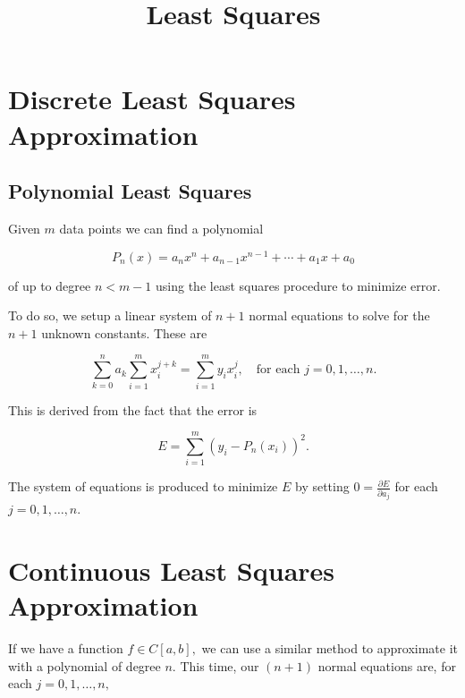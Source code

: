 \documentclass{article}
\title{Least Squares}
\begin{document}
\section{Discrete Least Squares Approximation}

\subsection{Polynomial Least Squares}

Given $m$ data points we can find a polynomial

\[ P_n(x) = a_n x^n + a_{n-1}x^{n-1} + \cdots + a_1 x + a_0 \]

of up to degree $n < m - 1$ using the least squares procedure to minimize error.

To do so, we setup a linear system of $n+1$ normal equations to solve for the $n+1$ unknown constants. These are

\[ \sum_{k=0}^n a_k \sum_{i=1}^m x_i^{j+k} = \sum_{i=1}^m y_i x_i^j, \quad \text{for each } j = 0, 1, \dots, n. \]

This is derived from the fact that the error is

\[ E = \sum_{i=1}^m (y_i - P_n(x_i))^2. \]

The system of equations is produced to minimize $E$ by setting $0 = \frac{\partial E}{\partial a_j}$  for each $j = 0, 1,\dots,n.$

\section{Continuous Least Squares Approximation}

If we have a function $f \in C[a,b],$ we can use a similar method to approximate it with a polynomial of degree $n.$ This time, our $(n+1)$ normal equations are, for each $j = 0, 1, \dots, n,$
\end{document}

